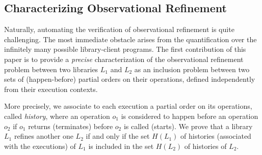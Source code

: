 
\subsection{Characterizing Observational Refinement}
\label{sec:intro:histories}

Naturally, automating the verification of observational refinement is quite
challenging. The most immediate obstacle arises from the quantification over
the infinitely many possible library-client programs. The first contribution of
this paper is to provide a \emph{precise} characterization of the observational
refinement problem between two libraries $L_1$ and $L_2$ as an inclusion
problem between two sets of (happen-before) partial orders on their operations,
defined independently from their execution contexts.

More precisely, we associate to each execution a partial order on its
operations, called \emph{history}, where an operation $o_1$ is considered to
happen before an operation $o_2$ if $o_1$ returns (terminates) before $o_2$ is
called (starts). We prove that a library $L_1$ refines another one $L_2$ if and
only if the set $H(L_1)$ of histories (associated with the executions) of $L_1$
is included in the set $H(L_2)$ of histories of $L_2$.

